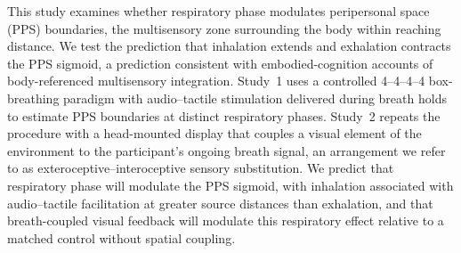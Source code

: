 
This study examines whether respiratory phase modulates peripersonal space (PPS) boundaries, the multisensory zone surrounding the body within reaching distance. We test the prediction that inhalation extends and exhalation contracts the PPS sigmoid, a prediction consistent with embodied-cognition accounts of body-referenced multisensory integration. Study~1 uses a controlled 4--4--4--4 box-breathing paradigm with audio--tactile stimulation delivered during breath holds to estimate PPS boundaries at distinct respiratory phases. Study~2 repeats the procedure with a head-mounted display that couples a visual element of the environment to the participant's ongoing breath signal, an arrangement we refer to as exteroceptive--interoceptive sensory substitution. We predict that respiratory phase will modulate the PPS sigmoid, with inhalation associated with audio--tactile facilitation at greater source distances than exhalation, and that breath-coupled visual feedback will modulate this respiratory effect relative to a matched control without spatial coupling.
